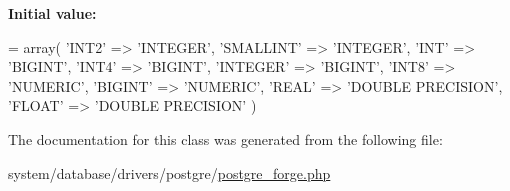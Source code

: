 {\bfseries Initial value\+:}
\begin{DoxyCode}
= array(
        \textcolor{stringliteral}{'INT2'}      => \textcolor{stringliteral}{'INTEGER'},
        \textcolor{stringliteral}{'SMALLINT'}  => \textcolor{stringliteral}{'INTEGER'},
        \textcolor{stringliteral}{'INT'}       => \textcolor{stringliteral}{'BIGINT'},
        \textcolor{stringliteral}{'INT4'}      => \textcolor{stringliteral}{'BIGINT'},
        \textcolor{stringliteral}{'INTEGER'}   => \textcolor{stringliteral}{'BIGINT'},
        \textcolor{stringliteral}{'INT8'}      => \textcolor{stringliteral}{'NUMERIC'},
        \textcolor{stringliteral}{'BIGINT'}    => \textcolor{stringliteral}{'NUMERIC'},
        \textcolor{stringliteral}{'REAL'}      => \textcolor{stringliteral}{'DOUBLE PRECISION'},
        \textcolor{stringliteral}{'FLOAT'}     => \textcolor{stringliteral}{'DOUBLE PRECISION'}
    )
\end{DoxyCode}


The documentation for this class was generated from the following file\+:\begin{DoxyCompactItemize}
\item 
system/database/drivers/postgre/\mbox{\hyperlink{postgre__forge_8php}{postgre\+\_\+forge.\+php}}\end{DoxyCompactItemize}
